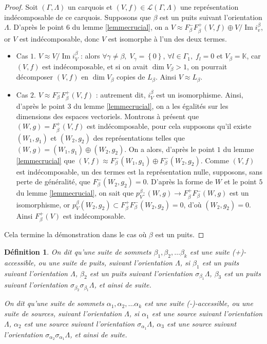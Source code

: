 \documentclass[a4paper,10pt]{article}
\newtheorem{defi}[]{Définition}[section]
\DeclareMathOperator{\Img}{Im}
\begin{document}
\begin{proof}
	Soit $(\Gamma,\Lambda)$ un carquois et $(V,f)\in\mathscr L(\Gamma,\Lambda)$ une représentation indécomposable de ce carquois. Supposons que $\beta$ est un puits suivant l'orientation $\Lambda$. D'après le point $6$ du lemme \ref{lemmecrucial}, on a $V\approx F_\beta^-F_\beta^+(V,f)\oplus V/\Img i_v^\beta$, or $V$ est indécomposable, donc $V$ est isomorphe à l'un des deux termes.
	\begin{itemize}
		\item Cas $1$. $V\approx V/\Img i_V^\beta$ : alors $\forall \gamma\neq\beta,\;V_\gamma=\left\{ 0 \right\}$, $\forall l\in\Gamma_1,\;f_l=0$ et $V_\beta=\mathbb K$, car $(V,f)$ est indécomposable, et si on avait $\dim V_\beta>1$, on pourrait décomposer $(V,f)$ en $\dim V_\beta$ copies de $L_\beta$. Ainsi $V\approx L_\beta$.
		\item Cas $2$. $V\approx F_\beta^-F_\beta^+(V,f)$ : autrement dit, $i_V^\beta$ est un isomorphisme. Ainsi, d'après le point $3$ du lemme \ref{lemmecrucial}, on a les égalités sur les dimensions des espaces vectoriels. Montrons à présent que $(W,g)=F_\beta^+(V,f)$ est indécomposable, pour cela supposons qu'il existe $(W_1,g_1)$ et $(W_2,g_2)$ des représentations telles que $(W,g)=(W_1,g_1)\oplus(W_2,g_2)$. On a alors, d'après le point $1$ du lemme \ref{lemmecrucial} que $(V,f)\approx F_\beta^-(W_1,g_1)\oplus F_\beta^-(W_2,g_2)$. Comme $(V,f)$ est indécomposable, un des termes est la représentation nulle, supposons, sans perte de généralité, que $F_\beta^-(W_2,g_2)=0$. D'après la forme de $W$ et le point $5$ du lemme \ref{lemmecrucial}, on sait que $p_V^\beta:(W,g)\rightarrow F_\beta^+F_\beta^-(W,g)$ est un isomorphisme, or $p_V^\beta(W_2,g_2)\subset F_\beta^+F_\beta^-(W_2,g_2)=0$, d'où $(W_2,g_2)=0$. Ainsi $F_\beta^+(V)$ est indécomposable. 
	\end{itemize}
Cela termine la démonstration dans le cas où $\beta$ est un puits.
\end{proof}
\begin{defi}
	On dit qu'une suite de sommets $\beta_1,\beta_2,\dots\beta_k$ est une suite (+)-accessible, ou une suite de puits, suivant l'orientation $\Lambda$, si $\beta_1$ est un puits suivant l'orientation $\Lambda$, $\beta_2$ est un puits suivant l'orientation $\sigma_{\beta_1}\Lambda$, $\beta_3$ est un puits suivant l'orientation $\sigma_{\beta_2}\sigma_{\beta_1}\Lambda$, et ainsi de suite.

	On dit qu'une suite de sommets $\alpha_1,\alpha_2,\dots\alpha_k$ est une suite (-)-accessible, ou une suite de sources, suivant l'orientation $\Lambda$, si $\alpha_1$ est une source suivant l'orientation $\Lambda$, $\alpha_2$ est une source suivant l'orientation $\sigma_{\alpha_1}\Lambda$, $\alpha_3$ est une source suivant l'orientation $\sigma_{\alpha_2}\sigma_{\alpha_1}\Lambda$, et ainsi de suite.
\end{defi}
\end{document}
